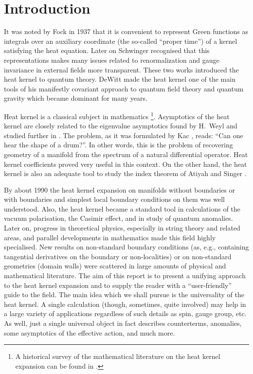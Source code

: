 \section{Introduction} \label{sec1}
It was noted by Fock \cite{Fock:1937} in 1937 that it is convenient
to represent Green functions as integrals over an auxiliary
coordinate (the so-called ``proper time'') of a kernel satisfying
the heat equation. Later on Schwinger \cite{Schwinger:1951} recognised 
that this representations makes many issues related to renormalization
and gauge invariance in external fields
more transparent. These two works introduced the
heat kernel to quantum theory. DeWitt made the heat kernel one of the
main tools of his manifestly covariant approach 
\cite{DeWitt:1965,Dewitt:1967yk,Dewitt:1967ub,Dewitt:1967uc}
to quantum field theory and quantum gravity which became dominant 
for many years. 

Heat kernel is a classical subject in mathematics 
\cite{Hadamard:1932}\footnote{A historical survey of 
the mathematical literature on the heat kernel expansion
can be found in \cite{Gilkey:1995}.}.
Asymptotics of the heat kernel are closely related to the eigenvalue
asymptotics  found by H.~Weyl \cite{Weyl:1912,Weyl:1915} 
and studied further in \cite{Mina,MinaPle}. The problem, as it was
formulated by Kac \cite{Kac:1966}, reads: ``Can one hear the shape of
a drum?''. In other words, this is the problem of recovering geometry
of a manifold from the spectrum of a natural differential operator.
Heat kernel coefficients proved very useful in this context.
On the other hand, the heat kernel is also an adequate tool
to study the index theorem of Atiyah and Singer 
\cite{Atiyah:1963a,Gilkey:1973,AtiyahBP:1973}.

By about 1990 the heat kernel expansion on manifolds without boundaries
or with boundaries and simplest local boundary conditions on them
was well understood. Also, the heat kernel became a standard tool
in calculations of the vacuum polarisation, the Casimir effect, and
in study of quantum anomalies. Later on, progress in theoretical
physics, especially in string theory and related areas, and parallel
developments in mathematics made this field highly specialised.
New results on non-standard boundary conditions (as, e.g., containing
tangential derivatives on the boundary or non-localities) or on
non-standard geometries (domain walls) were scattered in large
amounts of physical and mathematical literature. The aim of this
report is to present a unifying approach to the heat kernel expansion
and to supply the reader with a ``user-friendly'' guide to
the field. The main idea which we shall pursue is the universality of
the heat kernel. A single calculation (though, sometimes, quite
involved) may help in a large variety of applications regardless
of such details as spin, gauge group, etc. As well, just a single
universal object in fact describes counterterms, anomalies,
some asymptotics of the effective action, and much more.

